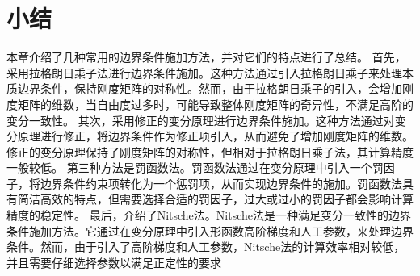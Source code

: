 \section{小结}
本章介绍了几种常用的边界条件施加方法，并对它们的特点进行了总结。
首先，采用拉格朗日乘子法进行边界条件施加。这种方法通过引入拉格朗日乘子来处理本质边界条件，保持刚度矩阵的对称性。然而，由于拉格朗日乘子的引入，会增加刚度矩阵的维数，当自由度过多时，可能导致整体刚度矩阵的奇异性，不满足高阶的变分一致性。
其次，采用修正的变分原理进行边界条件施加。这种方法通过对变分原理进行修正，将边界条件作为修正项引入，从而避免了增加刚度矩阵的维数。修正的变分原理保持了刚度矩阵的对称性，但相对于拉格朗日乘子法，其计算精度一般较低。
第三种方法是罚函数法。罚函数法通过在变分原理中引入一个罚因子，将边界条件约束项转化为一个惩罚项，从而实现边界条件的施加。罚函数法具有简洁高效的特点，但需要选择合适的罚因子，过大或过小的罚因子都会影响计算精度的稳定性。
最后，介绍了Nitsche法。Nitsche法是一种满足变分一致性的边界条件施加方法。它通过在变分原理中引入形函数高阶梯度和人工参数，来处理边界条件。然而，由于引入了高阶梯度和人工参数，Nitsche法的计算效率相对较低，并且需要仔细选择参数以满足正定性的要求
